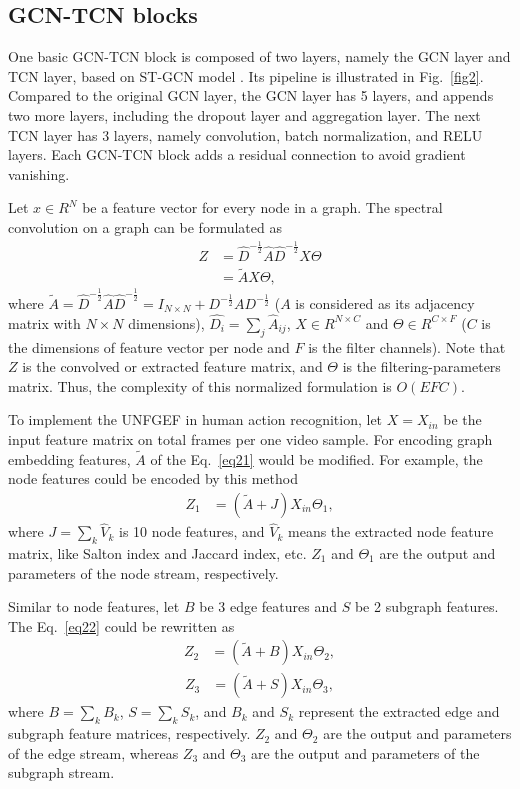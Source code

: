 \documentclass[journal]{IEEEtran}
\begin{document}
\subsection{GCN-TCN blocks}

One basic GCN-TCN block is composed of two layers, namely the GCN layer and TCN layer, based on ST-GCN model \cite{yan2018spatial}. Its pipeline is illustrated in Fig.~\ref{fig2}. Compared to the original GCN layer, the GCN layer has 5 layers, and appends two more layers, including the dropout layer and aggregation layer. The next TCN layer has 3 layers, namely convolution, batch normalization, and RELU layers. Each GCN-TCN block adds a residual connection to avoid gradient vanishing.

Let $x \in R^N$ be a feature vector for every node in a graph. The spectral convolution on a graph can be formulated as
\begin{align}
 Z&=\hat{D}^{-\frac{1}{2}}\hat{A}\hat{D}^{-\frac{1}{2}}X\Theta \nonumber \\
    &=\widetilde{A}X\Theta,
\label{eq21}
\end{align}
where $\widetilde{A}=\hat{D}^{-\frac{1}{2}}\hat{A}\hat{D}^{-\frac{1}{2}}=I_{N \times N}+D^{-\frac{1}{2}}AD^{-\frac{1}{2}}$ ($A$ is considered as its adjacency matrix with $N \times N$ dimensions), $\hat{D_i}=\sum_j \hat{A}_{ij}$, $X \in R^{N \times C}$ and $\Theta \in R^{C \times F}$ ($C$ is the dimensions of feature vector per node and $F$ is the filter channels). Note that $Z$ is the convolved or extracted feature matrix, and $\Theta$ is the filtering-parameters matrix.  Thus, the complexity of this normalized formulation is $O(EFC)$.

To implement the UNFGEF in human action recognition, let $X=X_{in}$ be the input feature matrix on total frames per one video sample. For encoding graph embedding features, $\widetilde{A}$ of the Eq.~\ref{eq21} would be modified. For example, the node features could be encoded by this method
\begin{align}
 Z_1&=(\widetilde{A}+J)X_{in}\Theta_1,
\label{eq22}
\end{align}
where $J=\sum_k \hat{V}_k$ is 10 node features, and $\hat{V}_k$ means the extracted node feature matrix, like Salton index and Jaccard index, etc. $Z_1$ and $\Theta_1$ are the output and parameters of the node stream, respectively.

Similar to node features, let $B$ be 3 edge features and $S$ be 2 subgraph features. The Eq.~\ref{eq22} could be rewritten as
\begin{align}
 Z_2&=(\widetilde{A}+B)X_{in}\Theta_2,
 \label{eq23}
\end{align}
\begin{align}
 Z_3&=(\widetilde{A}+S)X_{in}\Theta_3,
 \label{eq24}
\end{align}
where $B=\sum_{k}B_k$, $S=\sum_{k}S_k$, and $B_k$ and $S_k$ represent the extracted edge and subgraph feature matrices, respectively. $Z_2$ and $\Theta_2$ are the output and parameters of the edge stream, whereas $Z_3$ and $\Theta_3$ are the output and parameters of the subgraph stream.
\end{document}
